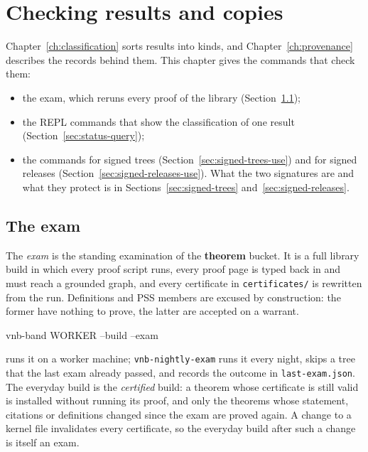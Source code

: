 \chapter{Checking results and copies}
\label{ch:checking}

Chapter~\ref{ch:classification} sorts results into kinds, and
Chapter~\ref{ch:provenance} describes the records behind them.  This
chapter gives the commands that check them:
\begin{itemize}
\item the exam, which reruns every proof of the library
  (Section~\ref{sec:vnb-test});
\item the REPL commands that show the classification of one result
  (Section~\ref{sec:status-query});
\item the commands for signed trees (Section~\ref{sec:signed-trees-use})
  and for signed releases (Section~\ref{sec:signed-releases-use}).  What
  the two signatures are and what they protect is in
  Sections~\ref{sec:signed-trees} and~\ref{sec:signed-releases}.
\end{itemize}


\section{The exam}
\label{sec:vnb-test}

The \emph{exam} is the standing examination of the \textbf{theorem}
bucket.  It is a full library build in which every proof script runs,
every proof page is typed back in and must reach a grounded graph, and
every certificate in \texttt{certificates/} is rewritten from the run.
Definitions and PSS members are excused by construction: the former have
nothing to prove, the latter are accepted on a warrant.

\begin{VNBsnip}
vnb-band WORKER --build --exam
\end{VNBsnip}

\noindent
runs it on a worker machine; \texttt{vnb-nightly-exam} runs it every
night, skips a tree that the last exam already passed, and records the
outcome in \texttt{last-exam.json}.  The everyday build is the
\emph{certified} build: a theorem whose certificate is still valid is
installed without running its proof, and only the theorems whose
statement, citations or definitions changed since the exam are proved
again.  A change to a kernel file invalidates every certificate, so the
everyday build after such a change is itself an exam.

